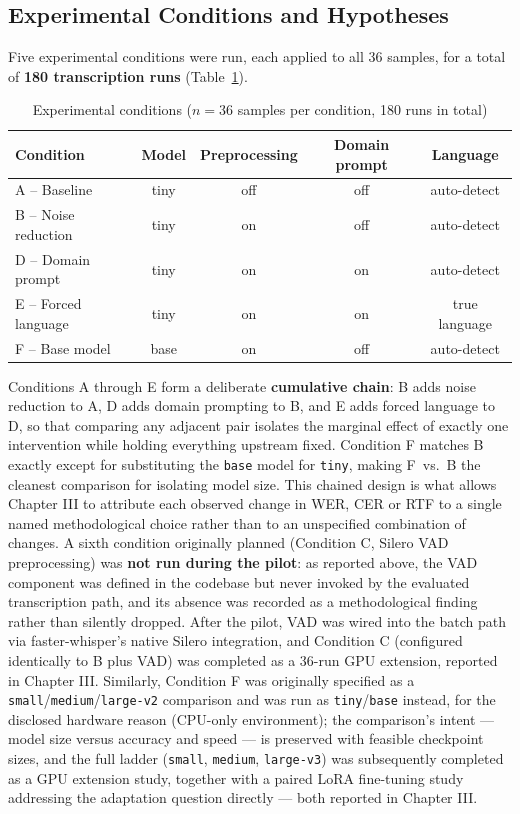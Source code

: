 \documentclass[12pt]{report}
\begin{document}
\subsection{Experimental Conditions and Hypotheses}
Five experimental conditions were run, each applied to all 36 samples, for a total of \textbf{180 transcription runs} (Table~\ref{tab:conditions}).
\begin{table}[H]
\centering
\small
\begin{tabular}{|l|c|c|c|c|}
\hline
\textbf{Condition} & \textbf{Model} & \textbf{Preprocessing} & \textbf{Domain prompt} & \textbf{Language} \\ \hline
A -- Baseline & tiny & off & off & auto-detect \\ \hline
B -- Noise reduction & tiny & on & off & auto-detect \\ \hline
D -- Domain prompt & tiny & on & on & auto-detect \\ \hline
E -- Forced language & tiny & on & on & true language \\ \hline
F -- Base model & base & on & off & auto-detect \\ \hline
\end{tabular}
\caption{Experimental conditions ($n=36$ samples per condition, 180 runs in total)}
\label{tab:conditions}
\end{table}
Conditions A through E form a deliberate \textbf{cumulative chain}: B adds noise reduction to A, D adds domain prompting to B, and E adds forced language to D, so that comparing any adjacent pair isolates the marginal effect of exactly one intervention while holding everything upstream fixed. Condition F matches B exactly except for substituting the \texttt{base} model for \texttt{tiny}, making F~vs.~B the cleanest comparison for isolating model size. This chained design is what allows Chapter III to attribute each observed change in WER, CER or RTF to a single named methodological choice rather than to an unspecified combination of changes.
A sixth condition originally planned (Condition C, Silero VAD preprocessing) was \textbf{not run during the pilot}: as reported above, the VAD component was defined in the codebase but never invoked by the evaluated transcription path, and its absence was recorded as a methodological finding rather than silently dropped. After the pilot, VAD was wired into the batch path via faster-whisper's native Silero integration, and Condition C (configured identically to B plus VAD) was completed as a 36-run GPU extension, reported in Chapter III. Similarly, Condition F was originally specified as a \texttt{small}/\texttt{medium}/\texttt{large-v2} comparison and was run as \texttt{tiny}/\texttt{base} instead, for the disclosed hardware reason (CPU-only environment); the comparison's intent --- model size versus accuracy and speed --- is preserved with feasible checkpoint sizes, and the full ladder (\texttt{small}, \texttt{medium}, \texttt{large-v3}) was subsequently completed as a GPU extension study, together with a paired LoRA fine-tuning study addressing the adaptation question directly --- both reported in Chapter III.
\end{document}
